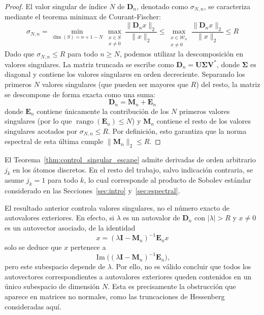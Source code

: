 \begin{proof}
	El valor singular de índice $N$ de $\mathbf{D}_n$, denotado como $\sigma_{N,n}$, se caracteriza mediante el teorema minimax de Courant-Fischer:
	\begin{equation}
		\sigma_{N,n} = \min_{\dim(S) = n+1-N} \max_{\substack{x \in S \\ x \neq 0}} \frac{\|\mathbf{D}_n x\|_2}{\|x\|_2} \le \max_{\substack{x \in \mathcal{W}_n \\ x \neq 0}} \frac{\|\mathbf{D}_n x\|_2}{\|x\|_2} \le R
	\end{equation}
	Dado que $\sigma_{N,n} \le R$ para todo $n \ge N$, podemos utilizar la descomposición en valores singulares. La matriz truncada se escribe como $\mathbf{D}_n = \mathbf{U} \mathbf{\Sigma} \mathbf{V}^*$, donde $\mathbf{\Sigma}$ es diagonal y contiene los valores singulares en orden decreciente.
	Separando los primeros $N$ valores singulares (que pueden ser mayores que $R$) del resto, la matriz se descompone de forma exacta como una suma:
	$$ \mathbf{D}_n = \mathbf{M}_n + \mathbf{E}_n $$
	donde $\mathbf{E}_n$ contiene únicamente la contribución de los $N$ primeros valores singulares (por lo que $\operatorname{rango}(\mathbf{E}_n) \le N$) y $\mathbf{M}_n$ contiene el resto de los valores singulares acotados por $\sigma_{N,n} \le R$. Por definición, esto garantiza que la norma espectral de esta última cumple $\|\mathbf{M}_n\|_2 \le R$.
\end{proof}

\begin{rmk}
	El Teorema~\ref{thm:control_singular_escape} admite derivadas de orden arbitrario $j_k$ en los átomos discretos. En el resto del trabajo, salvo indicación contraria, se asume $j_k=1$ para todo $k$, lo cual corresponde al producto de Sobolev estándar considerado en las Secciones~\ref{sec:intro} y~\ref{sec:espectral}.
\end{rmk}

\begin{rmk}
	El resultado anterior controla valores singulares, no el número exacto de autovalores exteriores. En efecto, si $\lambda$ es un autovalor de $\mathbf{D}_n$ con $|\lambda| > R$ y $x \neq 0$ es un autovector asociado, de la identidad
	\begin{equation}\label{eq:autovector_escape}
		x = (\lambda \mathbf{I} - \mathbf{M}_n)^{-1} \mathbf{E}_n x
	\end{equation}
	solo se deduce que $x$ pertenece a
	\[
		\operatorname{Im}\bigl((\lambda \mathbf{I} - \mathbf{M}_n)^{-1} \mathbf{E}_n\bigr),
	\]
	pero este subespacio depende de $\lambda$. Por ello, no es válido concluir que todos los autovectores correspondientes a autovalores exteriores queden contenidos en un único subespacio de dimensión $N$. Esta es precisamente la obstrucción que aparece en matrices no normales, como las truncaciones de Hessenberg consideradas aquí.
\end{rmk}

